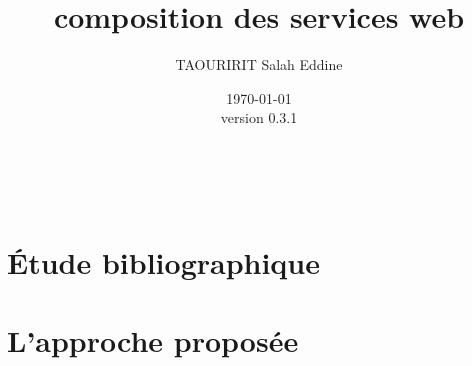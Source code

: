 \documentclass[a4paper, oneside, 12pt]{report}
\author{TAOURIRIT Salah Eddine}
\title{composition des services web}
\date{\today\\version 0.3.1}
\begin{document}
\let\Item\item \newcommand{\head}[1]{\textnormal{\textbf{#1}}}
\newcommand\SpecialItem{\renewcommand\item[1][]{\Item[\hspace{0.5cm}\textbullet~\sffamily ##1]}}
\newcommand\SpecialItemI{\renewcommand\item[1][]{\Item[\textendash~\sffamily ##1]}}

\renewcommand{\descriptionlabel}[1]{\hspace{0.5cm}\textbullet~\textsf{#1}}
\renewcommand\enddescription{\endlist\global\let\item\Item}

\renewcommand{\thesubsubsection}{} %
\newtheorem{mydef}{Definition}

\captionsetup[figure]{name=Figure.}
\captionsetup[table]{name=Table.}

\maketitle

\setcounter{secnumdepth}{4}
\setcounter{tocdepth}{2}

\tableofcontents

\printglossaries\
\listoffigures
\listoftables

\newpage
{}


\part{Étude bibliographique}


\part{L'approche proposée}






\begin{appendices}


\end{appendices}
\end{document}
